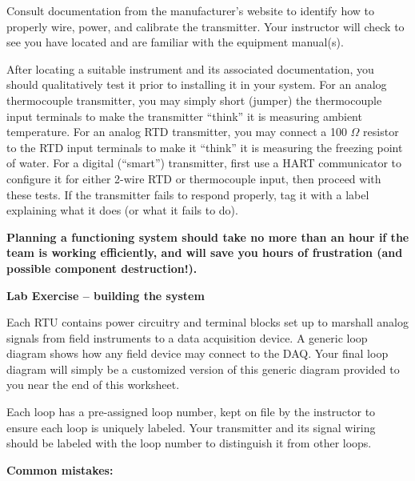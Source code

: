 \begin{itemize}
Consult documentation from the manufacturer's website to identify how to properly wire, power, and calibrate the transmitter.  Your instructor will check to see you have located and are familiar with the equipment manual(s).

After locating a suitable instrument and its associated documentation, you should qualitatively test it prior to installing it in your system.  For an analog thermocouple transmitter, you may simply short (jumper) the thermocouple input terminals to make the transmitter ``think'' it is measuring ambient temperature.  For an analog RTD transmitter, you may connect a 100 $\Omega$ resistor to the RTD input terminals to make it ``think'' it is measuring the freezing point of water.  For a digital (``smart'') transmitter, first use a HART communicator to configure it for either 2-wire RTD or thermocouple input, then proceed with these tests.  If the transmitter fails to respond properly, tag it with a label explaining what it does (or what it fails to do).

\vskip 10pt

{\bf Planning a functioning system should take no more than an hour if the team is working efficiently, and will save you hours of frustration (and possible component destruction!).}









\vfil \eject

\noindent
{\bf Lab Exercise -- building the system}

\vskip 5pt

Each RTU contains power circuitry and terminal blocks set up to marshall analog signals from field instruments to a data acquisition device.  A generic loop diagram shows how any field device may connect to the DAQ.  Your final loop diagram will simply be a customized version of this generic diagram provided to you near the end of this worksheet.

Each loop has a pre-assigned loop number, kept on file by the instructor to ensure each loop is uniquely labeled.  Your transmitter and its signal wiring should be labeled with the loop number to distinguish it from other loops.

\vskip 10pt

{\bf Common mistakes:}


\end{itemize}
